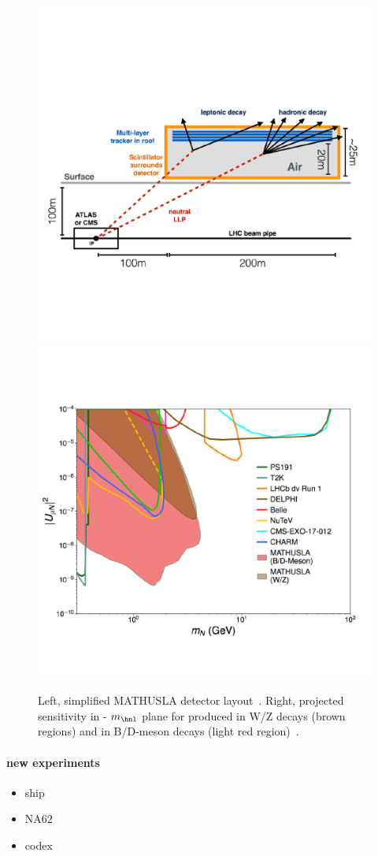 \begin{figure}[h!]
\centering
    \includegraphics[clip,trim=0.3cm 0cm 1.cm 2cm, width=.45\textwidth]{Figures/c7/mathusla1.pdf}
    \includegraphics[clip,trim=0cm 2cm 0.5cm 3cm, width=.54\textwidth]{Figures/c7/mathusla2.pdf}
\caption{Left, simplified MATHUSLA detector
  layout~\cite{Alimena_2020}. Right, projected sensitivity in \mixparm
  - $m_\hnl$ plane for \hnl produced in W/Z decays (brown regions) and in B/D-meson decays (light red region)~\cite{Curtin_2019}.
}
\label{fig:mathu2}
\end{figure}







\paragraph{new experiments}
\begin{itemize}
\item ship
\item NA62
\item codex
\end{itemize}


